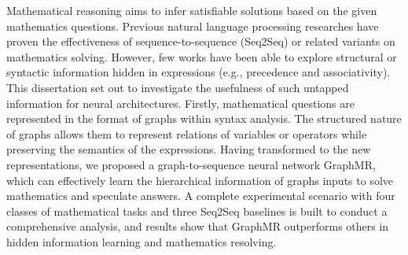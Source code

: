 Mathematical reasoning aims to infer satisfiable solutions based on the given mathematics questions. Previous natural language processing researches have proven the effectiveness of sequence-to-sequence (Seq2Seq) or related variants on mathematics solving. However, few works have been able to explore structural or syntactic information hidden in expressions (e.g., precedence and associativity). This dissertation set out to investigate the usefulness of such untapped information for neural architectures. Firstly, mathematical questions are represented in the format of graphs within syntax analysis. The structured nature of graphs allows them to represent relations of variables or operators while preserving the semantics of the expressions. Having transformed to the new representations, we proposed a graph-to-sequence neural network GraphMR, which can effectively learn the hierarchical information of graphs inputs to solve mathematics and speculate answers. A complete experimental scenario with four classes of mathematical tasks and three Seq2Seq baselines is built to conduct a comprehensive analysis, and results show that GraphMR outperforms others in hidden information learning and mathematics resolving.
